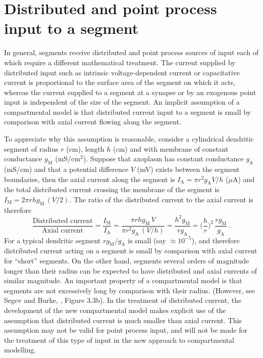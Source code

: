 \section{Distributed and point process input to a segment}\label{dpi}

In general, segments receive distributed and point process sources
of input each of which require a different mathematical treatment.
The current supplied by distributed input such as intrinsic
voltage-dependent current or capacitative current is proportional
to the surface area of the segment on which it acts, whereas the
current supplied to a segment at a synapse or by an exogenous
point input is independent of the size of the segment. An implicit
assumption of a compartmental model is that distributed current
input to a segment is small by comparison with axial current
flowing along the segment.

To appreciate why this assumption is reasonable, consider a
cylindrical dendritic segment of radius $r$ (cm), length $h$ (cm)
and with membrane of constant conductance $g_\mathrm{M}$
(mS/cm$^2$). Suppose that axoplasm has constant conductance
$g_\mathrm{A}$ (mS/cm) and that a potential difference $V$ (mV)
exists between the segment boundaries, then the axial current
along the segment is $I_\mathrm{A}=\pi r^2 g_\mathrm{A} V/h$
($\mu$A) and the total distributed current crossing the membrane
of the segment is $I_\mathrm{M}=2\pi r h g_\mathrm{M}\,(V/2)$. The
ratio of the distributed current to the axial current is therefore
\begin{equation}\label{pc1}
\frac{\mbox{Distributed current}}{\mbox{Axial current}}
=\frac{I_\mathrm{M}}{I_\mathrm{A}}=\frac{\pi r h g_\mathrm{M}\,V}
{\pi r^2 g_\mathrm{A}\,(V/h)}=\frac{h^2 g_\mathrm{M}} {r
g_\mathrm{A}}=\Big(\frac{h}{r}\Big)^2\, \frac{r
g_\mathrm{M}}{g_\mathrm{A}}\,.
\end{equation}
For a typical dendritic segment $r g_\mathrm{M}/g_\mathrm{A}$ is
small (say $ \approx 10^{-5}$), and therefore distributed current
acting on a segment is small by comparison with axial current for
``short'' segments. On the other hand, segments several orders of
magnitude longer than their radius can be expected to have
distributed and axial currents of similar magnitude. An important
property of a compartmental model is that segments are not
excessively long by comparison with their radius. (However, see
Segev and Burke, \cite{Segev98}, Figure 3.3b). In the treatment of
distributed current, the development of the new compartmental
model makes explicit use of the assumption that distributed
current is much smaller than axial current. This assumption may
not be valid for point process input, and will not be made for the
treatment of this type of input in the new approach to
compartmental modelling.

